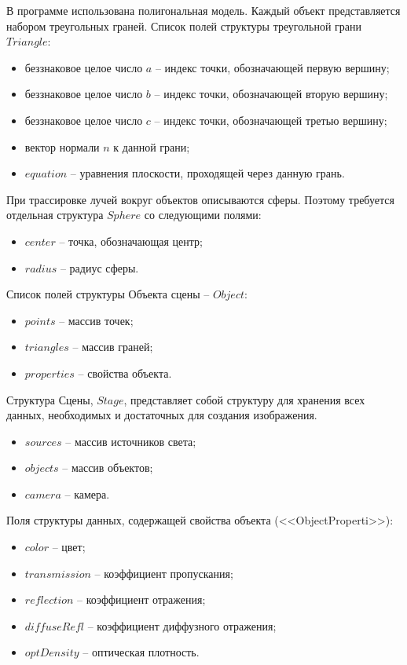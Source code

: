 {    В программе использована полигональная модель.
    Каждый объект представляется набором треугольных граней.
    Список полей структуры треугольной грани $Triangle$:
    \begin{itemize}
        \item беззнаковое целое число $a$ --
        индекс точки, обозначающей первую вершину;
        \item беззнаковое целое число $b$ --
        индекс точки, обозначающей вторую вершину;
        \item беззнаковое целое число $c$ --
        индекс точки, обозначающей третью вершину;
        \item вектор нормали $n$ к данной грани;
        \item $equation$ -- уравнения плоскости, проходящей через данную грань.
    \end{itemize}
    
    При трассировке лучей вокруг объектов описываются сферы.
    Поэтому требуется отдельная структура $Sphere$ со следующими полями:
    \begin{itemize}
        \item $center$ -- точка, обозначающая центр;
        \item $radius$ -- радиус сферы.
    \end{itemize}
    
    Список полей структуры Объекта сцены -- $Object$:
    \begin{itemize}
        \item $points$ -- массив точек;
        \item $triangles$ -- массив граней;
        \item $properties$ -- свойства объекта.
    \end{itemize}
    
    Структура Сцены, $Stage$, представляет собой структуру для
    хранения всех данных, необходимых и достаточных для создания изображения.
    \begin{itemize}
        \item $sources$ -- массив источников света;
        \item $objects$ -- массив объектов;
        \item $camera$ -- камера.
    \end{itemize}
    
    Поля структуры данных, содержащей свойства объекта (<<ObjectProperti>>):
    \begin{itemize}
        \item $color$ -- цвет;
        \item $transmission$ -- коэффициент пропускания;
        \item $reflection$ -- коэффициент отражения;
        \item $diffuseRefl$ -- коэффициент диффузного отражения;
        \item $optDensity$ -- оптическая плотность.
    \end{itemize}
    
}
